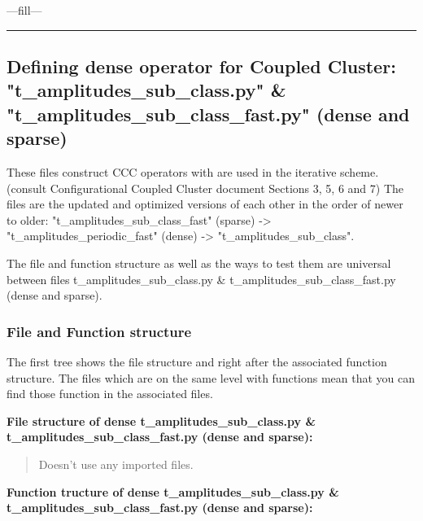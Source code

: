 \documentclass[a4paper,10pt]{article}
\begin{document}
---fill---

\noindent\rule{\linewidth}{0.4pt}




\subsection{Defining dense operator for Coupled Cluster: "t\_amplitudes\_sub\_class.py" \& "t\_amplitudes\_sub\_class\_fast.py" (dense and sparse)}

These files construct CCC operators with are used in the iterative scheme.(consult Configurational Coupled Cluster document Sections 3, 5, 6 and 7) The files are the updated and optimized versions of each other in the order of newer to older: "t\_amplitudes\_sub\_class\_fast" (sparse) -> "t\_amplitudes\_periodic\_fast" (dense) -> "t\_amplitudes\_sub\_class".

The file and function structure as well as the ways to test them are universal between files t\_amplitudes\_sub\_class.py \& t\_amplitudes\_sub\_class\_fast.py (dense and sparse).



\subsubsection{File and Function structure}

The first tree shows the file structure and right after the associated function structure. The files which are on the same level with functions mean that you can find those function in the associated files.


\textbf{\newline File structure of dense t\_amplitudes\_sub\_class.py \& t\_amplitudes\_sub\_class\_fast.py (dense and sparse): \newline}

\begin{quote}
  Doesn't use any imported files.
\end{quote}


\textbf{\newline Function tructure of dense t\_amplitudes\_sub\_class.py \& t\_amplitudes\_sub\_class\_fast.py (dense and sparse): \newline}
\end{document}
